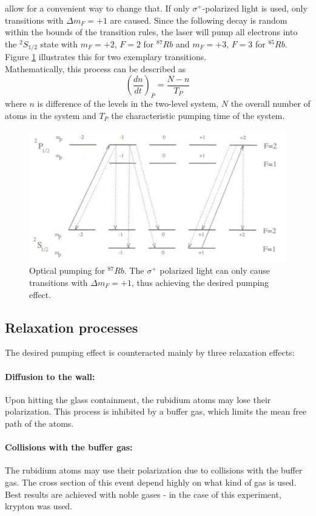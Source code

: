 allow for a convenient way to change that. If only $\sigma^+$-polarized light is used, only transitions with $\Delta m_F=+1$ are caused. Since the following decay is random within the bounds of the transition rules, the laser will pump all electrons into the $^2S_{1/2}$ state with $m_F=+2$, $F=2$ for $^{87}Rb$ and $m_F=+3$, $F=3$ for $^{85}Rb$. Figure \ref{fig:zeemanpumping} illustrates this for two exemplary transitions.\\
Mathematically, this process can be described as 
\begin{equation}
\left(\frac{dn}{dt}\right)_P=\frac{N-n}{T_P}
\label{eq:pumpingtime}
\end{equation}
where $n$ is difference of the levels in the two-level system, $N$ the overall number of atoms in the system and $T_P$ the characteristic pumping time of the system.
\begin{figure}[h]
\centering
\includegraphics[width=1.0\linewidth]{graphics/zeemanpumping}
\caption[Optical pumping]{Optical pumping for $^{87}Rb$. The $\sigma^+$ polarized light can only cause transitions with $\Delta m_F=+1$, thus achieving the desired pumping effect.}
\label{fig:zeemanpumping}
\end{figure}
\subsection{Relaxation processes}
The desired pumping effect is counteracted mainly by three relaxation effects:
\paragraph{Diffusion to the wall:}
Upon hitting the glass containment, the rubidium atoms may lose their polarization. This process is inhibited by a buffer gas, which limits the mean free path of the atoms.
\paragraph{Collisions with the buffer gas:}
The rubidium atoms may use their polarization due to collisions with the buffer gas. The cross section of this event depend highly on what kind of gas is used. Best results are achieved with noble gases - in the case of this experiment, krypton was used.
